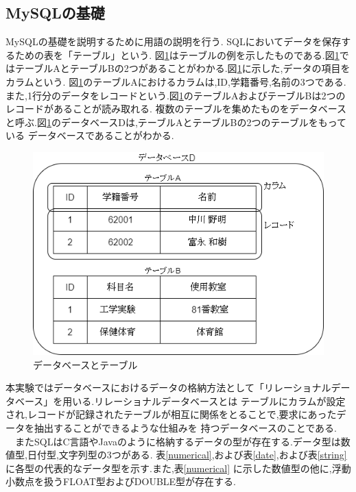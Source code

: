 \documentclass[a4j]{jarticle}
\begin{document}
    \subsection{MySQLの基礎}
    MySQLの基礎を説明するために用語の説明を行う.
    SQLにおいてデータを保存するための表を「テーブル」という.
    図\ref{db}はテーブルの例を示したものである.図\ref{db}ではテーブルAとテーブルBの2つがあることがわかる.図\ref{db}に示した,データの項目をカラムという.
    図\ref{db}のテーブルAにおけるカラムは,ID,学籍番号,名前の3つである.また,1行分のデータをレコードという.図\ref{db}のテーブルAおよびテーブルBは2つのレコードがあることが読み取れる.
    複数のテーブルを集めたものをデータベースと呼ぶ.図\ref{db}のデータベースDは,テーブルAとテーブルBの2つのテーブルをもっている
    データベースであることがわかる.
    \begin{figure}[H]
      \centering
      \includegraphics[scale=0.5]{db.png}
      \caption{データベースとテーブル}
       \label{db}
      \end{figure}

    本実験ではデータベースにおけるデータの格納方法として「リレーショナルデータベース」を用いる.リレーショナルデータベースとは
    テーブルにカラムが設定され,レコードが記録されたテーブルが相互に関係をとることで,要求にあったデータを抽出することができるような仕組みを
    持つデータベースのことである.\\
    　またSQLはC言語やJavaのように格納するデータの型が存在する.データ型は数値型,日付型,文字列型の3つがある.
    表\ref{numerical},および表\ref{date},および表\ref{string}に各型の代表的なデータ型を示す.また,表\ref{numerical}
    に示した数値型の他に,浮動小数点を扱うFLOAT型およびDOUBLE型が存在する.
    
\end{document}
